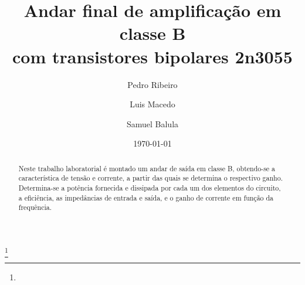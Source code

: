 \documentclass[%
  reprint,
  nofootinbib,
  amsmath,amssymb,
  aps,
  10pt,
  a4paper
]{revtex4-1}
\begin{document}


 

\title{Andar final de amplificação em classe B\\
com transistores bipolares 2n3055}
\thanks{}

\author{Pedro Ribeiro}%
\author{Luis Macedo}%
\author{Samuel Balula}%



\date{\today}

\begin{abstract}
Neste trabalho laboratorial é montado um andar de saída em classe B, obtendo-se a característica de tensão e corrente, a partir das quais se determina o respectivo ganho. Determina-se a potência fornecida e dissipada por cada um dos elementos do circuito, a eficiência, as impedâncias de entrada e saída, e o ganho de corrente em função da frequência.

\end{abstract}
\maketitle
\end{document}
